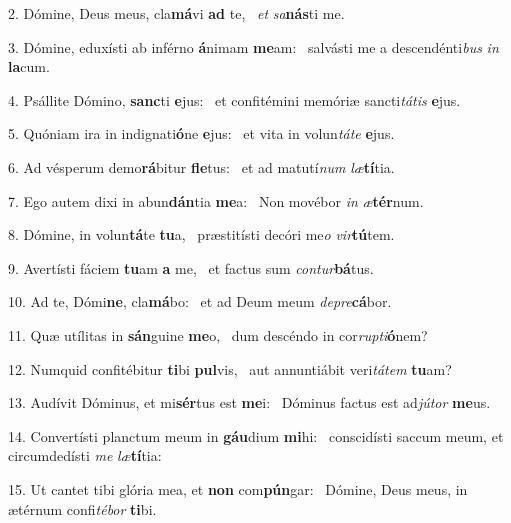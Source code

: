 2. Dómine, Deus meus, cla\textbf{má}vi \textbf{ad} te, \ast\  \textit{et} \textit{sa}\textbf{nás}ti me.\

3. Dómine, eduxísti ab inférno \textbf{á}nimam \textbf{me}am: \ast\  salvásti me a descendénti\textit{bus} \textit{in} \textbf{la}cum.\

4. Psállite Dómino, \textbf{sanc}ti \textbf{e}jus: \ast\  et confitémini memóriæ sancti\textit{tá}\textit{tis} \textbf{e}jus.\

5. Quóniam ira in indignati\textbf{ó}ne \textbf{e}jus: \ast\  et vita in volun\textit{tá}\textit{te} \textbf{e}jus.\

6. Ad vésperum demo\textbf{rá}bitur \textbf{fle}tus: \ast\  et ad matutí\textit{num} \textit{læ}\textbf{tí}tia.\

7. Ego autem dixi in abun\textbf{dán}tia \textbf{me}a: \ast\  Non movébor \textit{in} \textit{æ}\textbf{tér}num.\

8. Dómine, in volun\textbf{tá}te \textbf{tu}a, \ast\  præstitísti decóri me\textit{o} \textit{vir}\textbf{tú}tem.\

9. Avertísti fáciem \textbf{tu}am \textbf{a} me, \ast\  et factus sum \textit{con}\textit{tur}\textbf{bá}tus.\

10. Ad te, Dómi\textbf{ne}, cla\textbf{má}bo: \ast\  et ad Deum meum \textit{de}\textit{pre}\textbf{cá}bor.\

11. Quæ utílitas in \textbf{sán}guine \textbf{me}o, \ast\  dum descéndo in cor\textit{rup}\textit{ti}\textbf{ó}nem?\

12. Numquid confitébitur \textbf{ti}bi \textbf{pul}vis, \ast\  aut annuntiábit veri\textit{tá}\textit{tem} \textbf{tu}am?\

13. Audívit Dóminus, et mi\textbf{sér}tus est \textbf{me}i: \ast\  Dóminus factus est ad\textit{jú}\textit{tor} \textbf{me}us.\

14. Convertísti planctum meum in \textbf{gáu}dium \textbf{mi}hi: \ast\  conscidísti saccum meum, et circumdedísti \textit{me} \textit{læ}\textbf{tí}tia:\

15. Ut cantet tibi glória mea, et \textbf{non} com\textbf{pún}gar: \ast\  Dómine, Deus meus, in ætérnum confi\textit{té}\textit{bor} \textbf{ti}bi.\

